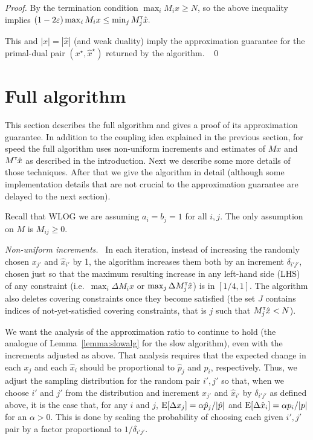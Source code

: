 \documentclass[11pt]{svjour3} \usepackage{fullpage}
\renewcommand{\paragraph}[1]{\smallskip\vspace{2pt}\par{\em #1}~}
\newcommand{\primalOf}[1]{{{#1}}}
\newcommand{\dualOf}[1]{{\hat{#1}}}
\newcommand{\MM}{M}
\newcommand{\xp}{\primalOf x}
\newcommand{\pp}{\primalOf p}
\newcommand{\xd}{\dualOf x}
\newcommand{\pd}{\dualOf p}
\newcommand{\dd}{\delta}
\newenvironment{Proof}{\begin{proof}}{{} ~\hfill\hfill\qed~\end{proof}}
\newcommand{\eps}{\varepsilon}
\newcommand{\tran}{^{\scriptscriptstyle \sf T\hspace*{-0.05em}}}
\newcommand{\E}{{\rm E}}
\begin{document}
\begin{Proof}
By the termination condition $\max_i \MM_i\xp \ge N$, so the above inequality implies
\((1-2\eps) \max_i \MM_i \xp \le \min_j \MM_j\tran \xd. \)

This and  $|\xp| = |\xd|$ (and weak duality) imply the approximation guarantee
for the primal-dual pair $(\xp^\star, \xd^\star)$ returned by the algorithm.
\end{Proof}


\section{Full algorithm}
This section describes the full algorithm 
and gives a proof of its approximation guarantee.
In addition to the coupling idea explained in the previous section,
for speed
the full algorithm uses non-uniform increments
and estimates of $M\xp$ and $M\tran\xd$ as described in the introduction.
Next we describe some more details of those techniques.
After that we give the algorithm in detail
(although some implementation details that are not crucial to the approximation guarantee
are delayed to the next section).

Recall that WLOG we are assuming $a_i=b_j = 1$ for all $i,j$.
The only assumption on $M$ is $M_{ij} \ge 0$.

\paragraph{Non-uniform increments.}
In each iteration, instead of increasing the randomly chosen $\xp_{j'}$ and $\xd_{i'}$ by 1, the algorithm increases them both by an increment $\dd_{i'j'}$, chosen just so that the maximum resulting increase in any left-hand side (LHS) of any constraint  (i.e.\ $\max_i \Delta \MM_i \xp$ or $\max_j \Delta \MM\tran_j \xd$) is in $[1/4,1]$.  
The algorithm also deletes covering constraints once they become satisfied
(the set $J$ contains indices of not-yet-satisfied covering constraints,
that is $j$ such that $M\tran_j\xd < N$).

We want the analysis of the approximation ratio to continue to hold
(the analogue of Lemma~\ref{lemma:slowalg} for the slow algorithm),
even with the increments adjusted as above.
That analysis requires that the expected change in each $\xp_j$ and each $\xd_i$ should be proportional to $\pd_j$ and $\pp_i$, respectively.
Thus, we adjust the sampling distribution for the random pair $i',j'$ so that,
when we choose $i'$ and $j'$ from the distribution
and increment $\xp_{j'}$ and $\xd_{i'}$ by $\delta_{i'j'}$ as defined above,
it is the case that, for any $i$ and $j$,
$\E[\Delta \xp_j] = \alpha \pd_j/|\pd|$ and $\E[\Delta \xd_i] = \alpha \pp_i/|\pp|$ for an $\alpha>0$.
This is done by scaling the probability of choosing each given $i',j'$ pair by a factor proportional to $1/\delta_{i'j'}$.
\end{document}
